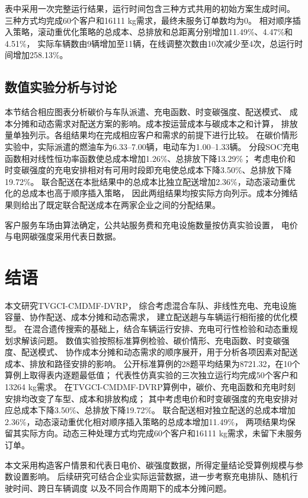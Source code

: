 \documentclass{setp-new}
\begin{document}
表中采用一次完整运行结果，运行时间包含三种方式共用的初始方案生成时间。
三种方式均完成60个客户和16111 kg需求，最终未服务订单数均为0。
相对顺序插入策略，滚动重优化策略的总成本、总排放和总距离分别增加11.49\%、4.47\%和4.51\%，
实际车辆数由9辆增加至11辆，在线调整次数由10次减少至4次，总运行时间增加258.13\%。

\subsection{数值实验分析与讨论}

本节结合相应图表分析碳价与车队派遣、充电函数、时变碳强度、配送模式、
成本分摊和动态需求对配送方案的影响。成本按运营成本与碳成本之和计算，
排放量单独列示。各组结果均在完成相应客户和需求的前提下进行比较。
在碳价情形实验中，实际派遣的燃油车为6.33--7.00辆，电动车为1.00--1.33辆。
分段SOC充电函数相对线性恒功率函数使总成本增加1.26\%、总排放下降13.29\%；
考虑电价和时变碳强度的充电安排相对有可用时段即充电使总成本下降3.50\%、总排放下降19.72\%。
联合配送在本批结果中的总成本比独立配送增加2.36\%，动态滚动重优化的总成本也高于顺序插入策略，
因此两组结果均按实际方向列示。成本分摊结果则给出了既定联合配送成本在两家企业之间的分配结果。

客户服务车场由算法确定，公共站服务费和充电设施数量按仿真实验设置，
电价与电网碳强度采用代表日数据。

\section{结语}

本文研究TVGCI-CMDMF-DVRP，
综合考虑混合车队、非线性充电、充电设施容量、协作配送、成本分摊和动态需求，
建立配送趟与车辆运行相衔接的优化模型。
在混合遗传搜索的基础上，结合车辆运行安排、充电可行性检验和动态重规划求解该问题。
数值实验按照标准算例检验、碳价情形、充电函数、时变碳强度、配送模式、
协作成本分摊和动态需求的顺序展开，用于分析各项因素对配送成本、排放和路径安排的影响。
公开标准算例的28题平均结果为8721.32，在10个算例上取得表内逐题最低值；
代表性仿真实验的三次独立运行均完成50个客户和13264 kg需求。
在TVGCI-CMDMF-DVRP算例中，碳价、充电函数和充电时刻安排均改变了车型、成本和排放构成；
其中考虑电价和时变碳强度的充电安排对应总成本下降3.50\%、总排放下降19.72\%。
联合配送相对独立配送的总成本增加2.36\%，动态滚动重优化相对顺序插入策略的总成本增加11.49\%，
两项结果均保留其实际方向。动态三种处理方式均完成60个客户和16111 kg需求，未留下未服务订单。

本文采用构造客户情景和代表日电价、碳强度数据，所得定量结论受算例规模与参数设置影响。
后续研究可结合企业实际运营数据，进一步考察充电排队、随机行驶时间、跨日车辆调度
以及不同合作周期下的成本分摊问题。
\end{document}
